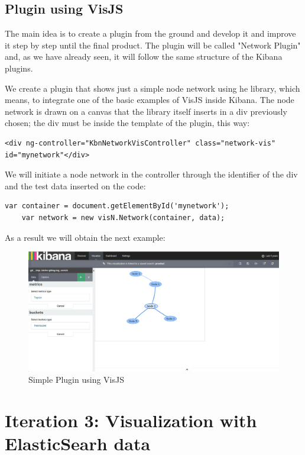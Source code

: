 \documentclass[a4paper, 12pt]{book}
\begin{document}
\subsection{Plugin using VisJS}

The main idea is to create a plugin from the ground and develop it and improve it step by step until the final product. The plugin will be called "Network Plugin" and, as we have already seen, it will follow the same structure of the Kibana plugins.

We create a plugin that shows just a simple node network using he library, which means, to integrate one of the basic examples of VisJS inside Kibana. The node network is drawn on a canvas that the library itself inserts in a div previously chosen; the div must be inside the template of the plugin, this way: 

\begin{lstlisting}[frame=single]
	<div ng-controller="KbnNetworkVisController" class="network-vis" id="mynetwork"</div>
\end{lstlisting}

We will initiate a node network in the controller through the identifier of the div and the test data inserted on the code:

\begin{lstlisting}[frame=single]
	var container = document.getElementById('mynetwork');
	var network = new visN.Network(container, data);
\end{lstlisting}

As a result we will obtain the next example:

\begin{figure}[H]
  \centering
  \includegraphics[width=16cm, keepaspectratio]{img/development/integration}
  \caption{Simple Plugin using VisJS}
  \label{fig:examplepluginvisjs}
\end{figure}


\section{Iteration 3: Visualization with ElasticSearh data}
\end{document}
